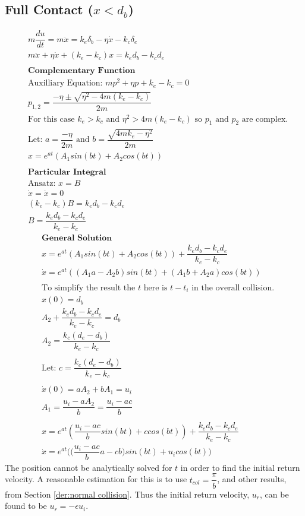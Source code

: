 \documentclass[a4paper,11pt,titlepage]{report}
\begin{document}
\subsection{Full Contact ($x < d_b$)}
\begin{align*}
&m \dfrac{du}{dt} = m \ddot{x} = k_e \delta_b - \eta \dot{x} - k_c \delta_e \\
&m\ddot{x} + \eta \dot{x} + (k_e - k_c) x = k_e d_b - k_c d_e \\\\
&\textbf{Complementary Function} \\
&\text{Auxilliary Equation: } mp^2 + \eta p + k_e - k_c = 0 \\
&p_{1,2} = \dfrac{- \eta \pm \sqrt{\eta^2 - 4m(k_e - k_c)}}{2 m} \\
&\text{For this case $k_e > k_c$ and $\eta ^ 2 > 4 m (k_e - k_c)$ so $p_1$ and $p_2$ are complex.} \\
&\text{Let: } a = \dfrac{-\eta}{2m} \text{ and } b = \dfrac{\sqrt{4mk_e - \eta ^ 2}}{2m} \\
&x = e^{at} (A_1 sin(bt) + A_2 cos (bt)) \\\\
&\textbf{Particular Integral} \\
&\text{Ansatz: } x = B \\
&\dot{x} = \ddot{x} = 0 \\
&(k_e - k_c)B = k_e d_b - k_c d_e \\
& B = \dfrac{k_e d_b - k_c d_e}{k_e - k_c}
\end{align*}
\begin{align*}
&\textbf{General Solution} \\
&x = e^{at} (A_1 sin(bt) + A_2 cos (bt)) + \dfrac{k_e d_b - k_c d_e}{k_e - k_c} \\
&\dot{x} = e^{at}((A_1 a - A_2 b)sin(bt) + (A_1 b + A_2 a) cos(bt)) \\\\
&\text{To simplify the result the $t$ here is $t - t_i$ in the overall collision.} \\
&x(0) = d_b \\
&A_2 + \dfrac{k_e d_b - k_c d_e}{k_e - k_c} = d_b \\
&A_2 = \dfrac{k_c (d_e - d_b)}{k_e - k_c} \\\\
&\text{Let: } c = \dfrac{k_c (d_e - d_b)}{k_e - k_c} \\\\
&\dot{x}(0) = aA_2 + bA_1 = u_i \\
&A_1 = \dfrac{u_i - aA_2}{b} = \dfrac{u_i - ac}{b} \\\\
&x = e^{at} (\dfrac{u_i - ac}{b} sin(bt) + c cos (bt)) + \dfrac{k_e d_b - k_c d_e}{k_e - k_c} \\
&\dot{x} = e^{at}\Big(\Big(\dfrac{u_i - ac}{b} a - c b\Big)sin(bt) + u_i cos(bt)\Big)
\end{align*}
The position cannot be analytically solved for $t$ in order to find the initial return velocity. A reasonable estimation for this is to use $t_{col} = \dfrac{\pi}{b}$, and other results, from Section \ref{der:normal collision}. Thus the initial return velocity, $u_r$, can be found to be $u_r = - \epsilon u_i$.
\end{document}
